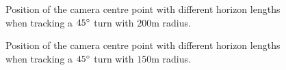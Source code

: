 \begin{figure}
	\centering
	\caption{Position of the camera centre point with different horizon lengths when tracking a $45\degree$ turn with $200$m radius.}
	\label{fig:cur_45deg_200m_camera_position}
\end{figure}

\begin{figure}
	\centering
	\caption{Position of the camera centre point with different horizon lengths when tracking a $45\degree$ turn with $150$m radius.}
	\label{fig:cur_45deg_150m_camera_position}
\end{figure}




